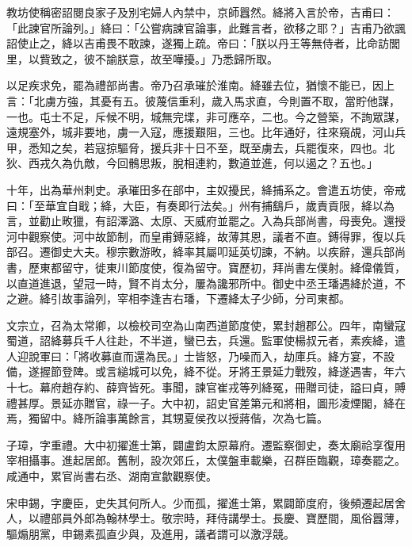 \begin{pinyinscope}
 教坊使稱密詔閱良家子及別宅婦人內禁中，京師囂然。絳將入言於帝，吉甫曰：「此諫官所論列。」絳曰：「公嘗病諫官論事，此難言者，欲移之耶？」吉甫乃欲諷詔使止之，絳以吉甫畏不敢諫，遂獨上疏。帝曰：「朕以丹王等無侍者，比命訪閭里，以貲致之，彼不諭朕意，故至嘩擾。」乃悉歸所取。



 以足疾求免，罷為禮部尚書。帝乃召承璀於淮南。絳雖去位，猶懷不能已，因上言：「北虜方強，其憂有五。彼蔑信重利，歲入馬求直，今則置不取，當貯他謀，一也。屯士不足，斥候不明，城無完堞，非可應卒，二也。今之營築，不詢眾謀，遠規塞外，城非要地，虜一入寇，應援艱阻，三也。比年通好，往來窺覘，河山兵甲，悉知之矣，若寇掠驅脅，援兵非十日不至，既至虜去，兵罷復來，四也。北狄、西戎久為仇敵，今回鶻思叛，脫相連約，數道並進，何以遏之？五也。」



 十年，出為華州刺史。承璀田多在部中，主奴擾民，絳捕系之。會遣五坊使，帝戒曰：「至華宜自戢；絳，大臣，有奏即行法矣。」州有捕鷂戶，歲責貢限，絳以為言，並勸止畋獵，有詔澤潞、太原、天威府並罷之。入為兵部尚書，母喪免。還授河中觀察使。河中故節制，而皇甫鎛惡絳，故薄其恩，議者不直。鎛得罪，復以兵部召。遷御史大夫。穆宗數游畋，絳率其屬叩延英切諫，不納。以疾辭，還兵部尚書，歷東都留守，徙東川節度使，復為留守。寶歷初，拜尚書左僕射。絳偉儀質，以直道進退，望冠一時，賢不肖太分，屢為讒邪所中。御史中丞王璠遇絳於道，不之避。絳引故事論列，宰相李逢吉右璠，下遷絳太子少師，分司東都。



 文宗立，召為太常卿，以檢校司空為山南西道節度使，累封趙郡公。四年，南蠻寇蜀道，詔絳募兵千人往赴，不半道，蠻已去，兵還。監軍使楊叔元者，素疾絳，遣人迎說軍曰：「將收募直而還為民。」士皆怒，乃噪而入，劫庫兵。絳方宴，不設備，遂握節登陴。或言縋城可以免，絳不從。牙將王景延力戰歿，絳遂遇害，年六十七。幕府趙存約、薛齊皆死。事聞，諫官崔戎等列絳冤，冊贈司徒，謚曰貞，賻禮甚厚。景延亦贈官，祿一子。大中初，詔史官差第元和將相，圖形凌煙閣，絳在焉，獨留中。絳所論事萬餘言，其甥夏侯孜以授蔣偕，次為七篇。



 子璋，字重禮。大中初擢進士第，闢盧鈞太原幕府。遷監察御史，奏太廟祫享復用宰相攝事。進起居郎。舊制，設次郊丘，太僕盤車載樂，召群臣臨觀，璋奏罷之。咸通中，累官尚書右丞、湖南宣歙觀察使。



 宋申錫，字慶臣，史失其何所人。少而孤，擢進士第，累闢節度府，後頻遷起居舍人，以禮部員外郎為翰林學士。敬宗時，拜侍講學士。長慶、寶歷間，風俗囂薄，驅煽朋黨，申錫素孤直少與，及進用，議者謂可以激浮競。




\end{pinyinscope}
